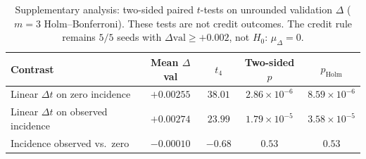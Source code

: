 \begin{table}[H]
\caption{Supplementary analysis: two-sided paired $t$-tests on
unrounded validation $\Delta$ ($m{=}3$ Holm--Bonferroni). These tests
are not credit outcomes. The credit rule remains $5/5$ seeds with
$\Delta\mathrm{val}\ge{+}0.002$, not $H_0{:}\,\mu_\Delta=0$.}
\label{tab:credit-stats}
\centering
\footnotesize
\begin{tabular}{@{}lcccc@{}}
\toprule
Contrast & Mean $\Delta$val & $t_4$ & Two-sided $p$ & $p_{\mathrm{Holm}}$ \\
\midrule
Linear $\Delta t$ on zero incidence & $+0.00255$ & $38.01$ & $2.86{\times}10^{-6}$ & $8.59{\times}10^{-6}$ \\
Linear $\Delta t$ on observed incidence & $+0.00274$ & $23.99$ & $1.79{\times}10^{-5}$ & $3.58{\times}10^{-5}$ \\
Incidence observed vs.\ zero & $-0.00010$ & $-0.68$ & $0.53$ & $0.53$ \\
\bottomrule
\end{tabular}
\end{table}
